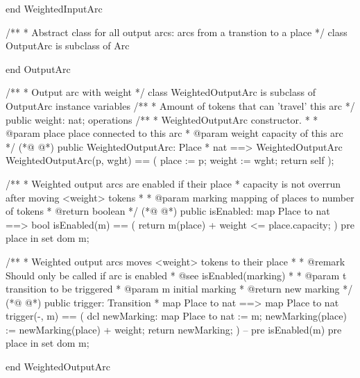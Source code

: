 \begin{vdmpp}
end WeightedInputArc

/**
 * Abstract class for all output arcs: arcs from a transtion to a place
 */
class OutputArc is subclass of Arc

end OutputArc

/**
 * Output arc with weight
 */
class WeightedOutputArc is subclass of OutputArc
  instance variables
   /**
    * Amount of tokens that can 'travel' this arc
    */
    public weight: nat;
  operations
    /**
     * WeightedOutputArc constructor.
     *
     * @param place place connected to this arc
     * @param weight capacity of this arc
     */
(*@
\label{WeightedOutputArc:216}
@*)
    public WeightedOutputArc: Place * nat ==> WeightedOutputArc
    WeightedOutputArc(p, wght) == (
      place := p;
      weight := wght;
      return self
    );

    /**
     * Weighted output arcs are enabled if their place
     * capacity is not overrun after moving <weight> tokens
     *
     * @param marking mapping of places to number of tokens
     * @return boolean
     */
(*@
\label{isEnabled:230}
@*)
    public isEnabled: map Place to nat ==> bool
    isEnabled(m) == (
      return m(place) + weight <= place.capacity;
    )
    pre place in set dom m;

    /**
     * Weighted output arcs moves <weight> tokens to their place
     *
     * @remark Should only be called if arc is enabled
     * @see isEnabled(marking)
     *
     * @param t transition to be triggered
     * @param m initial marking
     * @return new marking
     */
(*@
\label{trigger:245}
@*)
    public trigger: Transition * map Place to nat ==> map Place to nat
    trigger(-, m) == (
      dcl newMarking: map Place to nat := m;
      newMarking(place) := newMarking(place) + weight;
      return newMarking;
    )
    -- pre isEnabled(m)
    pre place in set dom m;

end WeightedOutputArc
\end{vdmpp}
\bigskip
